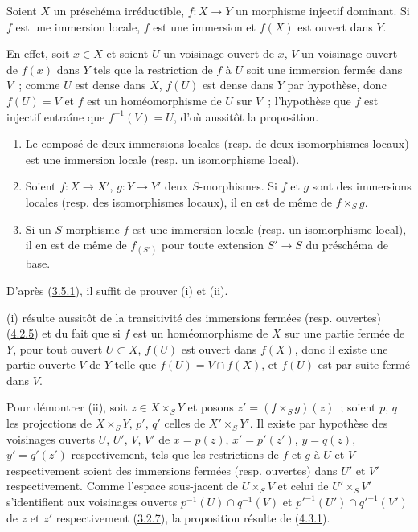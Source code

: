 \begin{proposition}[4.5.4]
\label{I.4.5.4-fr}
Soient $X$ un préschéma irréductible, $f:X\to Y$ un morphisme injectif
dominant. Si $f$ est une immersion locale, $f$ est une immersion et $f(X)$
est ouvert dans $Y$.
\end{proposition}

En effet, soit $x\in X$ et soient $U$ un voisinage ouvert de $x$, $V$ un
voisinage ouvert de $f(x)$ dans $Y$ tels que la restriction de $f$ à $U$
soit une immersion fermée dans $V$~; comme $U$ est dense dans $X$, $f(U)$
est dense dans $Y$ par hypothèse, donc $f(U)=V$ et $f$ est un homéomorphisme
de $U$ sur $V$~; l'hypothèse que $f$ est injectif entraîne que
$f^{-1}(V)=U$, d'où aussitôt la proposition.

\begin{proposition}[4.5.5]
\label{I.4.5.5-fr}
\begin{enumerate}
  \item[\rm(i)] Le composé de deux immersions locales (resp. de deux
    isomorphismes locaux) est une immersion locale (resp. un isomorphisme
    local).
  \item[\rm(ii)] Soient $f:X\to X'$, $g:Y\to Y'$ deux $S$-morphismes. Si
    $f$ et $g$ sont des immersions locales (resp. des isomorphismes locaux),
    il en est de même de $f\times_S g$.
  \item[\rm(iii)] Si un $S$-morphisme $f$ est une immersion locale (resp. un
    isomorphisme local), il en est de même de $f_{(S')}$ pour toute extension
    $S'\to S$ du préschéma de base.
\end{enumerate}
\end{proposition}

D'après (\hyperref[I.3.5.1-fr]{3.5.1}), il suffit de prouver (i) et (ii).

(i) résulte aussitôt de la transitivité des immersions fermées (resp.
ouvertes) (\hyperref[I.4.2.5-fr]{4.2.5}) et du fait que si $f$ est un
homéomorphisme de $X$ sur une partie fermée de $Y$, pour tout ouvert
$U\subset X$, $f(U)$ est ouvert dans $f(X)$, donc il existe une partie
ouverte $V$ de $Y$ telle que $f(U)=V\cap f(X)$, et $f(U)$ est par suite fermé
dans $V$.

Pour démontrer (ii), soit $z\in X\times_S Y$ et posons $z'=(f\times_S g)(z)$~; soient $p$, $q$ les projections de $X\times_S Y$, $p'$,
$q'$ celles de $X'\times_S Y'$. Il existe par hypothèse des voisinages
ouverts $U$, $U'$, $V$, $V'$ de $x=p(z)$, $x'=p'(z')$, $y=q(z)$,
$y'=q'(z')$ respectivement, tels que les restrictions de $f$ et $g$ à $U$
et $V$ respectivement soient des immersions fermées (resp. ouvertes) dans
$U'$ et $V'$ respectivement. Comme l'espace sous-jacent de $U\times_S V$ et
celui de $U'\times_S V'$ s'identifient aux voisinages ouverts
$p^{-1}(U)\cap q^{-1}(V)$ et ${p'}^{-1}(U')\cap{q'}^{-1}(V')$ de $z$ et
$z'$ respectivement (\hyperref[I.3.2.7-fr]{3.2.7}), la proposition résulte
de (\hyperref[I.4.3.1-fr]{4.3.1}).
